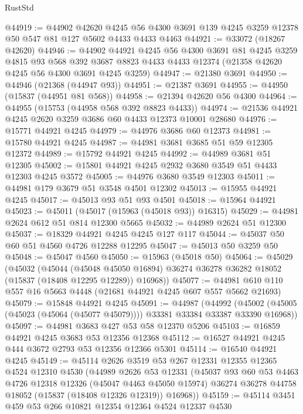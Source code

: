 \begin{lexlean}{RustStd}
\begin{coremodule}
{\begin{coremodule}
{{{{{{{{{{{{{{{{{{{{{{{{{{{{{{{{{{{{{{{{{{{{{{{{{{{{{{{{{{{{@44919 := @44902
    @42620
    @4245
    @56
    @4300
    @3691
    @139
    @4245
    @3259
    @12378
    @50
    @547
    @81
    @127
    @5602
    @4433
    @4433
    @4463
@44921 := @33072 (@18267 @42620)
@44946 := @44902
    @44921
    @4245
    @56
    @4300
    @3691
    @81
    @4245
    @3259
    @4815
    @93
    @568
    @392
    @3687
    @8823
    @4433
    @4433
    @12374
    (@21358 @42620 @4245 @56 @4300 @3691 @4245 @3259)
@44947 := @21380 @3691
@44950 := @44946 (@21368 (@44947 @93))
@44951 := @21387 @3691
@44955 := @44950 (@15837 (@44951 @81 @568))
@44958 := @21394 @42620 @56 @4300
@44964 := @44955 (@15753 (@44958 @568 @392 @8823 @4433))
@44974 := @21536 @44921 @4245 @2620 @3259 @3686 @60 @4433 @12373 @10001 @28680
@44976 := @15771 @44921 @4245
@44979 := @44976 @3686 @60 @12373
@44981 := @15780 @44921 @4245
@44987 := @44981 @3681 @3685 @51 @59 @12305 @12372
@44989 := @15792 @44921 @4245
@44992 := @44989 @3681 @51 @12305
@45002 := @15801 @44921 @4245 @2932 @3680 @3549 @51 @4433 @12303 @4245 @3572
@45005 := @44976 @3680 @3549 @12303
@45011 := @44981 @179 @3679 @51 @3548 @4501 @12302
@45013 := @15955 @44921 @4245
@45017 := @45013 @93 @51 @93 @4501
@45018 := @15964 @44921
@45023 := @45011 (@45017 (@15963 (@45018 @93)) @16315)
@45029 := @44981 @2624 @612 @51 @814 @12300 @5665
@45032 := @44989 @2624 @51 @12300
@45037 := @18329 @44921 @4245 @4245 @127 @117
@45044 := @45037 @50 @60 @51 @4560 @4726 @12288 @12295
@45047 := @45013 @50 @3259 @50
@45048 := @45047 @4560
@45050 := @15963 (@45018 @50)
@45064 := @45029
    (@45032
      (@45044
        (@45048 @45050 @16894)
        @36274
        @36278
        @36282
        @18052
        (@15837 (@18408 @12295 @12289))
        @16968))
@45077 := @44981 @610 @110 @557 @16 @5663 @4448 (@21681 @44921 @4245 @607 @557 @5662 @21693)
@45079 := @15848 @44921 @4245
@45091 := @44987
    (@44992 (@45002 (@45005 (@45023 (@45064 (@45077 @45079)))) @33381 @33384 @33387 @33390 @16968))
@45097 := @44981 @3683 @427 @53 @58 @12370 @5206
@45103 := @16859 @44921 @4245 @3683 @53 @12356 @12368
@45112 := @16527 @44921 @4245 @444 @3672 @2793 @53 @12356 @12366 @5301
@45114 := @16540 @44921 @4245
@45149 := @45114
    @2626
    @3519
    @53
    @267
    @12331
    @12355
    @12365
    @4524
    @12310
    @4530
    (@44989
      @2626
      @53
      @12331
      (@45037
        @93
        @60
        @53
        @4463
        @4726
        @12318
        @12326
        (@45047 @4463 @45050 @15974)
        @36274
        @36278
        @44758
        @18052
        (@15837 (@18408 @12326 @12319))
        @16968))
@45159 := @45114 @3451 @459 @53 @266 @10821 @12354 @12364 @4524 @12337 @4530
}}}}}}}}}}}}}}}}}}}}}}}}}}}}}}}}}}}}}}}}}}}}}}}}}}}}}}}}}}}}
\end{coremodule}}
\end{coremodule}
\end{lexlean}
